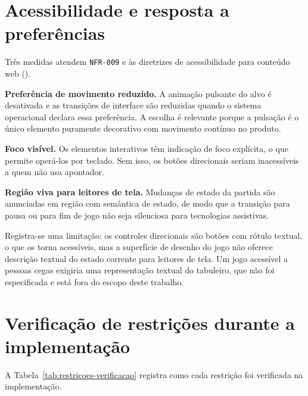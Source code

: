 

\section{Acessibilidade e resposta a preferências}
\label{sec:impl-acessibilidade}

Três medidas atendem \texttt{NFR-009} e às diretrizes de acessibilidade para
conteúdo web ().

\textbf{Preferência de movimento reduzido.} A animação pulsante do alvo é
desativada e as transições de interface são reduzidas quando o sistema operacional
declara essa preferência. A escolha é relevante porque a pulsação é o único
elemento puramente decorativo com movimento contínuo no produto.

\textbf{Foco visível.} Os elementos interativos têm indicação de foco explícita,
o que permite operá-los por teclado. Sem isso, os botões direcionais seriam
inacessíveis a quem não usa apontador.

\textbf{Região viva para leitores de tela.} Mudanças de estado da partida são
anunciadas em região com semântica de estado, de modo que a transição para pausa
ou para fim de jogo não seja silenciosa para tecnologias assistivas.

Registra-se uma limitação: os controles direcionais são botões com rótulo
textual, o que os torna acessíveis, mas a superfície de desenho do jogo não
oferece descrição textual do estado corrente para leitores de tela. Um jogo
acessível a pessoas cegas exigiria uma representação textual do tabuleiro, que
não foi especificada e está fora do escopo deste trabalho.

\section{Verificação de restrições durante a implementação}
\label{sec:impl-restricoes}

A Tabela~\ref{tab:restricoes-verificacao} registra como cada restrição foi
verificada na implementação.

